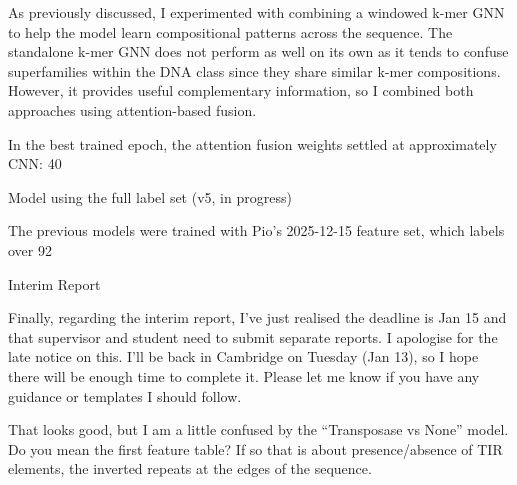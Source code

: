 \documentclass[12pt]{article}
\begin{document}
As previously discussed, I experimented with combining a windowed k-mer GNN to help the model learn compositional patterns across the sequence. The standalone k-mer GNN does not perform as well on its own as it tends to confuse superfamilies within the DNA class since they share similar k-mer compositions. However, it provides useful complementary information, so I combined both approaches using attention-based fusion.

In the best trained epoch, the attention fusion weights settled at approximately CNN: 40%

Model using the full label set (v5, in progress)

The previous models were trained with Pio's 2025-12-15 feature set, which labels over 92%

Interim Report

Finally, regarding the interim report, I've just realised the deadline is Jan 15 and that supervisor and student need to submit separate reports. I apologise for the late notice on this. I'll be back in Cambridge on Tuesday (Jan 13), so I hope there will be enough time to complete it. Please let me know if you have any guidance or templates I should follow.

\fi

\iffalse


That looks good, but I am a little confused by the “Transposase vs None” model. Do you mean the first feature table? If so that is about presence/absence of TIR elements, the inverted repeats at the edges of the sequence.
\end{document}
